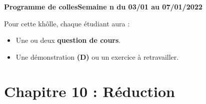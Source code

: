 \documentclass[twoside,a4paper,french,10pt]{VcCours}
\begin{document}

\begin{center}
\large\bf
Programme de collesSemaine n du 03/01 au 07/01/2022
\end{center}
\separationTitre


Pour cette khôlle, chaque étudiant aura :
\begin{itemize}
\item Une ou deux \textbf{question de cours}.
\item Une démonstration \textbf{(D)} ou un exercice à retravailler.
\end{itemize} 

\section*{Chapitre 10 : Réduction}
\end{document}
